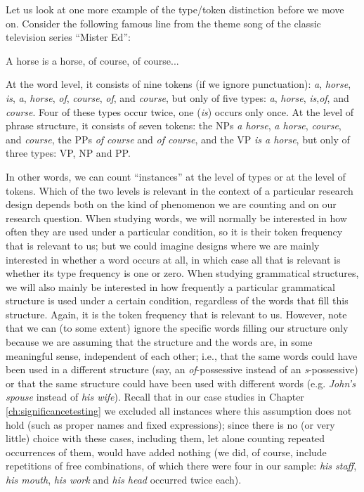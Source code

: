 Let us look at one more example of the type/token distinction before we move on. Consider the following famous line from the theme song of the classic television series ``Mister Ed'':

\begin{exe}
\ex A horse is a horse, of course, of course...
\label{ex:horseisahorse}
\end{exe}

At the word level, it consists of nine tokens (if we ignore punctuation): \textit{a}, \textit{horse}, \textit{is}, \textit{a}, \textit{horse}, \textit{of}, \textit{course}, \textit{of}, and \textit{course}, but only of five types: \textit{a}, \textit{horse}, \textit{is},\textit{of}, and \textit{course}. Four of these types occur twice, one (\textit{is}) occurs only once. At the level of phrase structure, it consists of seven tokens: the NPs \textit{a horse}, \textit{a horse}, \textit{course}, and \textit{course}, the PPs \textit{of course} and \textit{of course}, and the VP \textit{is a horse}, but only of three types: VP, NP and PP.

In other words, we can count ``instances'' at the level of types or at the level of tokens. Which of the two levels is relevant in the context of a particular research design depends both on the kind of phenomenon we are counting and on our research question. When studying words, we will normally be interested in how often they are used under a particular condition, so it is their token frequency that is relevant to us; but we could imagine designs where we are mainly interested in whether a word occurs at all, in which case all that is relevant is whether its type frequency is one or zero. When studying grammatical structures, we will also mainly be interested in how frequently a particular grammatical structure is used under a certain condition, regardless of the words that fill this structure. Again, it is the token frequency that is relevant to us. However, note that we can (to some extent) ignore the specific words filling our structure only because we are assuming that the structure and the words are, in some meaningful sense, independent of each other; i.e., that the same words could have been used in a different structure (say, an \textit{of}-possessive instead of an \textit{s}-possessive) or that the same structure could have been used with different words (e.g. \textit{John's spouse} instead of \textit{his wife}). Recall that in our case studies in Chapter \ref{ch:significancetesting} we excluded all instances where this assumption does not hold (such as proper names and fixed expressions); since there is no (or very little) choice with these cases, including them, let alone counting repeated occurrences of them, would have added nothing (we did, of course, include repetitions of free combinations, of which there were four in our sample: \textit{his staff}, \textit{his mouth}, \textit{his work} and \textit{his head} occurred twice each).

